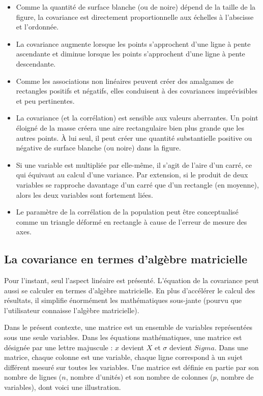 \documentclass[
]{book}
\begin{document}
\begin{itemize}
\item
  Comme la quantité de surface blanche (ou de noire) dépend de la taille de la figure, la covariance est directement proportionnelle aux échelles à l'abscisse et l'ordonnée.
\item
  La covariance augmente lorsque les points s'approchent d'une ligne à pente ascendante et diminue lorsque les points s'approchent d'une ligne à pente descendante.
\item
  Comme les associations non linéaires peuvent créer des amalgames de rectangles positifs et négatifs, elles conduisent à des covariances imprévisibles et peu pertinentes.
\item
  La covariance (et la corrélation) est sensible aux valeurs aberrantes. Un point éloigné de la masse créera une aire rectangulaire bien plus grande que les autres points. À lui seul, il peut créer une quantité substantielle positive ou négative de surface blanche (ou noire) dans la figure.
\item
  Si une variable est multipliée par elle-même, il s'agit de l'aire d'un carré, ce qui équivaut au calcul d'une variance. Par extension, si le produit de deux variables se rapproche davantage d'un carré que d'un rectangle (en moyenne), alors les deux variables sont fortement liées.
\item
  Le paramètre de la corrélation de la population peut être conceptualisé comme un triangle déformé en rectangle à cause de l'erreur de mesure des axes.
\end{itemize}

\hypertarget{la-covariance-en-termes-dalguxe8bre-matricielle}{%
\subsection{La covariance en termes d'algèbre matricielle}\label{la-covariance-en-termes-dalguxe8bre-matricielle}}

Pour l'instant, seul l'aspect linéaire est présenté. L'équation de la covariance peut aussi se calculer en termes d'algèbre matricielle. En plus d'accélérer le calcul des résultats, il simplifie énormément les mathématiques sous-jante (pourvu que l'utilisateur connaisse l'algèbre matricielle).

Dans le présent contexte, une matrice est un ensemble de variables représentées sous une seule variables. Dans les équations mathématiques, une matrice est désignée par une lettre majuscule : \(x\) devient \(X\) et \(\sigma\) devient \(Sigma\). Dans une matrice, chaque colonne est une variable, chaque ligne correspond à un sujet différent mesuré sur toutes les variables. Une matrice est définie en partie par son nombre de lignes (\(n\), nombre d'unités) et son nombre de colonnes (\(p\), nombre de variables), dont voici une illustration.
\end{document}
